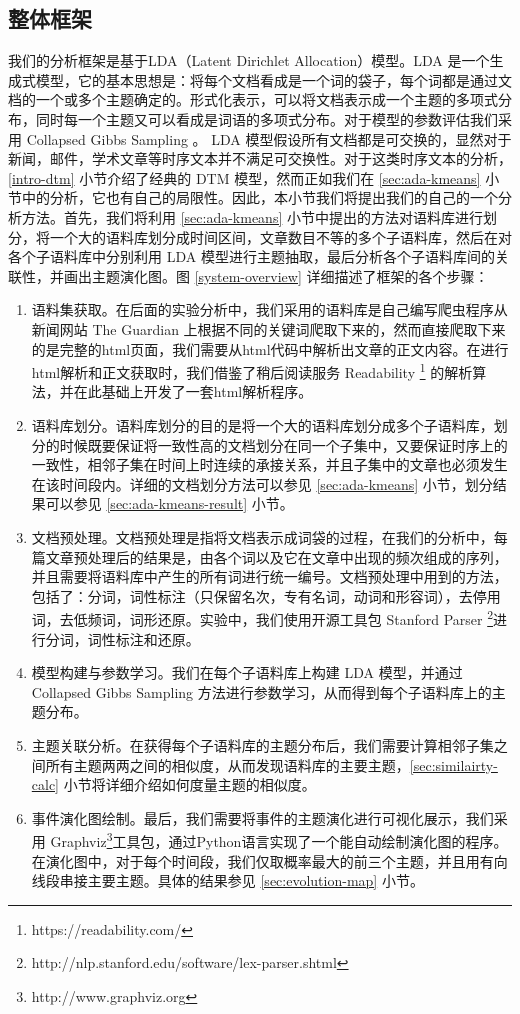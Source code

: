\subsection{整体框架}
\label{sec:framework}
我们的分析框架是基于LDA（Latent Dirichlet Allocation）\cite{Blei:2003}模型。LDA 是一个生成式模型，它的基本思想是：将每个文档看成是一个词的袋子，每个词都是通过文档的一个或多个主题确定的。形式化表示，可以将文档表示成一个主题的多项式分布，同时每一个主题又可以看成是词语的多项式分布。对于模型的参数评估我们采用 Collapsed Gibbs Sampling \cite{griffiths2004finding, heinrich2005parameter}。 LDA 模型假设所有文档都是可交换的，显然对于新闻，邮件，学术文章等时序文本并不满足可交换性。对于这类时序文本的分析，\ref{intro-dtm} 小节介绍了经典的 DTM 模型，然而正如我们在 \ref{sec:ada-kmeans} 小节中的分析，它也有自己的局限性。因此，本小节我们将提出我们的自己的一个分析方法。首先，我们将利用 \ref{sec:ada-kmeans} 小节中提出的方法对语料库进行划分，将一个大的语料库划分成时间区间，文章数目不等的多个子语料库，然后在对各个子语料库中分别利用 LDA 模型进行主题抽取，最后分析各个子语料库间的关联性，并画出主题演化图。图 \ref{system-overview} 详细描述了框架的各个步骤：
\begin{enumerate}[(1)]
\item 语料集获取。在后面的实验分析中，我们采用的语料库是自己编写爬虫程序从新闻网站  The Guardian 上根据不同的关键词爬取下来的，然而直接爬取下来的是完整的html页面，我们需要从html代码中解析出文章的正文内容。在进行html解析和正文获取时，我们借鉴了稍后阅读服务 Readability \footnote{https://readability.com/} 的解析算法，并在此基础上开发了一套html解析程序。
\item 语料库划分。语料库划分的目的是将一个大的语料库划分成多个子语料库，划分的时候既要保证将一致性高的文档划分在同一个子集中，又要保证时序上的一致性，相邻子集在时间上时连续的承接关系，并且子集中的文章也必须发生在该时间段内。详细的文档划分方法可以参见 \ref{sec:ada-kmeans} 小节，划分结果可以参见 \ref{sec:ada-kmeans-result} 小节。
\item 文档预处理。文档预处理是指将文档表示成词袋的过程，在我们的分析中，每篇文章预处理后的结果是，由各个词以及它在文章中出现的频次组成的序列，并且需要将语料库中产生的所有词进行统一编号。文档预处理中用到的方法，包括了：分词，词性标注（只保留名次，专有名词，动词和形容词），去停用词，去低频词，词形还原。实验中，我们使用开源工具包 Stanford Parser \footnote{http://nlp.stanford.edu/software/lex-parser.shtml}进行分词，词性标注和还原。
\item 模型构建与参数学习。我们在每个子语料库上构建 LDA 模型，并通过 Collapsed Gibbs Sampling \cite{griffiths2004finding, heinrich2005parameter} 方法进行参数学习，从而得到每个子语料库上的主题分布。
\item 主题关联分析。在获得每个子语料库的主题分布后，我们需要计算相邻子集之间所有主题两两之间的相似度，从而发现语料库的主要主题，\ref{sec:similairty-calc} 小节将详细介绍如何度量主题的相似度。
\item 事件演化图绘制。最后，我们需要将事件的主题演化进行可视化展示，我们采用 Graphviz\footnote{http://www.graphviz.org}工具包，通过Python语言实现了一个能自动绘制演化图的程序。在演化图中，对于每个时间段，我们仅取概率最大的前三个主题，并且用有向线段串接主要主题。具体的结果参见 \ref{sec:evolution-map} 小节。
\end{enumerate}
